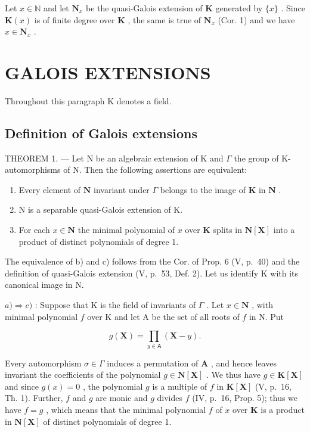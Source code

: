 Let \(x \in \mathbb{N}\) and let \(\mathbf{N}_x\) be the quasi-Galois extension of \(\mathbf{K}\) generated by \(\{x\}\) . Since \(\mathbf{K}(x)\) is of finite degree over \(\mathbf{K}\) , the same is true of \(\mathbf{N}_x\) (Cor. 1) and we have \(x \in \mathbf{N}_x\) .

\section{GALOIS EXTENSIONS}

Throughout this paragraph K denotes a field.

\subsection{Definition of Galois extensions}

THEOREM 1. --- Let N be an algebraic extension of K and \(\Gamma\) the group of K-automorphisms of N. Then the following assertions are equivalent:

\begin{enumerate}
\def\labelenumi{\alph{enumi})}
\item
  Every element of \(\mathbf{N}\) invariant under \(\Gamma\) belongs to the image of \(\mathbf{K}\) in \(\mathbf{N}\) .
\item
  N is a separable quasi-Galois extension of K.
\item
  For each \(x \in \mathbf{N}\) the minimal polynomial of \(x\) over \(\mathbf{K}\) splits in \(\mathbf{N}[\mathbf{X}]\) into a product of distinct polynomials of degree 1.
\end{enumerate}

The equivalence of b) and c) follows from the Cor. of Prop. 6 (V, p.~40) and the definition of quasi-Galois extension (V, p.~53, Def. 2). Let us identify K with its canonical image in N.

\(a) \Rightarrow c)\) : Suppose that K is the field of invariants of \(\Gamma\) . Let \(x \in \mathbf{N}\) , with minimal polynomial \(f\) over K and let A be the set of all roots of \(f\) in N. Put

\[
g (\mathbf {X}) = \prod_ {y \in \mathsf {A}} (\mathbf {X} - y).
\]

Every automorphism \(\sigma \in \Gamma\) induces a permutation of \(\mathbf{A}\) , and hence leaves invariant the coefficients of the polynomial \(g \in \mathbf{N}[\mathbf{X}]\) . We thus have \(g \in \mathbf{K}[\mathbf{X}]\) and since \(g(x) = 0\) , the polynomial \(g\) is a multiple of \(f\) in \(\mathbf{K}[\mathbf{X}]\) (V, p.~16, Th. 1). Further, \(f\) and \(g\) are monic and \(g\) divides \(f\) (IV, p.~16, Prop. 5); thus we have \(f = g\) , which means that the minimal polynomial \(f\) of \(x\) over \(\mathbf{K}\) is a product in \(\mathbf{N}[\mathbf{X}]\) of distinct polynomials of degree 1.

